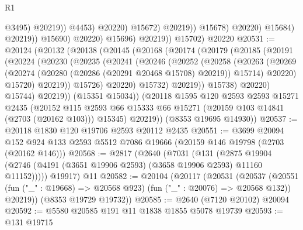 \begin{lexlean}{R1}
\begin{coremodule}
                                          @3495)
                                        @20219))
                                    @4453)
                                  @20220)
                                @15672)
                              @20219))
                          @15678)
                        @20220)
                      @15684)
                    @20219))
                @15690)
              @20220)
            @15696)
          @20219))
      @15702)
    @20220
@20531 := @20124
    (@20132
      (@20138
        (@20145
          (@20168
            (@20174
              (@20179
                (@20185
                  (@20191
                    (@20224
                      (@20230
                        (@20235
                          (@20241
                            (@20246
                              (@20252
                                (@20258
                                  (@20263
                                    (@20269
                                      (@20274
                                        (@20280 (@20286 (@20291 @20468 @15708) @20219))
                                        @15714)
                                      @20220)
                                    @15720)
                                  @20219))
                              @15726)
                            @20220)
                          @15732)
                        @20219))
                    @15738)
                  @20220)
                @15744)
              @20219))
          (@15351 @15034))
        (@20118
          @1595
          @120
          @2593
          @2593
          @15271
          @2435
          (@20152
            @115
            @2593
            @66
            @15333
            @66
            @15271
            (@20159 @103 @14841 (@2703 (@20162 @103)))
            @15345)
          @20219))
      (@8353 @19695 @14930))
@20537 := @20118 @1830 @120 @19706 @2593 @20112 @2435
@20551 := @3699
    @20094
    @152
    @924
    @133
    @2593
    @5512
    @7086
    @19666
    (@20159 @146 @19798 (@2703 (@20162 @146)))
@20568 := @2817
    (@2640
      (@7031
        (@131
          (@2875 @19904 (@2746 (@4191 (@3651 @19906 @2593) (@3658 @19906 @2593) @11160 @11152)))))
      @19917)
    @11
@20582 := @20104
    (@20117
      (@20531
        (@20537
          (@20551 (fun ("_" : @19668) => @20568 @923) (fun ("_" : @20076) => @20568 @132))
          @20219))
      (@8353 @19729 @19732))
@20585 := @2640 (@7120 @20102) @20094
@20592 := @5580 @20585 @191 @11 @1838 @1855 @5078 @19739
@20593 := @131 @19715

\end{coremodule}
\end{lexlean}
